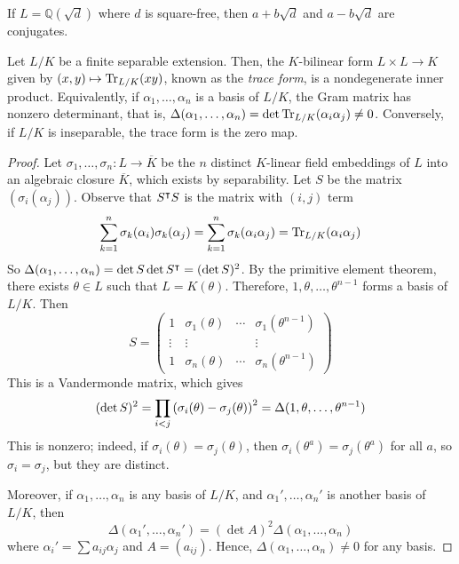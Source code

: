 \begin{example}
    If \( L = \mathbb Q(\sqrt d) \) where \( d \) is square-free, then \( a + b\sqrt d \) and \( a - b\sqrt d \) are conjugates.
\end{example}
\begin{proposition}
    Let \( L / K \) be a finite separable extension.
    Then, the \( K \)-bilinear form \( L \times L \to K \) given by \( (x, y) \mapsto \Tr_{L/K}(xy) \), known as the \emph{trace form}, is a nondegenerate inner product.
    Equivalently, if \( \alpha_1, \dots, \alpha_n \) is a basis of \( L / K \), the Gram matrix has nonzero determinant, that is, \( \Delta(\alpha_1, \dots, \alpha_n) = \det \Tr_{L/K}(\alpha_i \alpha_j) \neq 0 \).
    Conversely, if \( L / K \) is inseparable, the trace form is the zero map.
\end{proposition}
\begin{proof}
    Let \( \sigma_1, \dots, \sigma_n \colon L \to \overline K \) be the \( n \) distinct \( K \)-linear field embeddings of \( L \) into an algebraic closure \( \overline K \), which exists by separability.
    Let \( S \) be the matrix \( (\sigma_i(\alpha_j)) \).
    Observe that \( S^\intercal S \) is the matrix with \( (i,j) \) term
    \[ \sum_{k=1}^n \sigma_k(\alpha_i) \sigma_k(\alpha_j) = \sum_{k=1}^n \sigma_k(\alpha_i \alpha_j) = \Tr_{L/K}(\alpha_i \alpha_j) \]
    So \( \Delta(\alpha_1, \dots, \alpha_n) = \det S \det S^\intercal = (\det S)^2 \).
    By the primitive element theorem, there exists \( \theta \in L \) such that \( L = K(\theta) \).
    Therefore, \( 1, \theta, \dots, \theta^{n-1} \) forms a basis of \( L / K \).
    Then
    \[ S = \begin{pmatrix}
        1 & \sigma_1(\theta) & \cdots & \sigma_1(\theta^{n-1}) \\
        \vdots & \vdots & & \vdots \\
        1 & \sigma_n(\theta) & \cdots & \sigma_n(\theta^{n-1})
    \end{pmatrix} \]
    This is a Vandermonde matrix, which gives
    \[ (\det S)^2 = \prod_{i < j} \qty(\sigma_i(\theta) - \sigma_j(\theta))^2 = \Delta(1, \theta, \dots, \theta^{n-1}) \]
    This is nonzero; indeed, if \( \sigma_i(\theta) = \sigma_j(\theta) \), then \( \sigma_i(\theta^a) = \sigma_j(\theta^a) \) for all \( a \), so \( \sigma_i = \sigma_j \), but they are distinct.

    Moreover, if \( \alpha_1, \dots, \alpha_n \) is any basis of \( L / K \), and \( \alpha_1', \dots, \alpha_n' \) is another basis of \( L / K \), then
    \[ \Delta(\alpha_1', \dots, \alpha_n') = (\det A)^2 \Delta(\alpha_1, \dots, \alpha_n) \]
    where \( \alpha_i' = \sum a_{ij} \alpha_j \) and \( A = (a_{ij}) \).
    Hence, \( \Delta(\alpha_1, \dots, \alpha_n) \neq 0 \) for any basis.
\end{proof}
